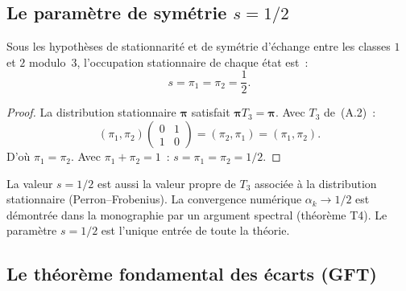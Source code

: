 \documentclass[12pt,a4paper]{article}
\begin{document}
\subsection{Le param\`etre de sym\'etrie $s = 1/2$}
\label{app:s_half}

\begin{derivedbox}[$s = 1/2$ comme distribution stationnaire]
Sous les hypoth\`eses de stationnarit\'e et de sym\'etrie d'\'echange
entre les classes $1$ et $2$ modulo~$3$, l'occupation stationnaire de
chaque \'etat est~:
\begin{equation}
  s = \pi_1 = \pi_2 = \frac{1}{2}.
  \tag{A.3}
\end{equation}

\begin{proof}
La distribution stationnaire $\bm{\pi}$ satisfait
$\bm{\pi} T_3 = \bm{\pi}$. Avec $T_3$ de~(A.2)~:
\[
  (\pi_1, \pi_2)
  \begin{pmatrix} 0 & 1 \\ 1 & 0 \end{pmatrix}
  = (\pi_2, \pi_1) = (\pi_1, \pi_2).
\]
D'o\`u $\pi_1 = \pi_2$. Avec $\pi_1 + \pi_2 = 1$~:
$s = \pi_1 = \pi_2 = 1/2$.
\end{proof}
\end{derivedbox}

\begin{remark}
La valeur $s = 1/2$ est aussi la valeur propre de $T_3$ associ\'ee
\`a la distribution stationnaire (Perron--Frobenius). La convergence
num\'erique $\alpha_k \to 1/2$ est d\'emontr\'ee dans la monographie
par un argument spectral (th\'eor\`eme T4). Le param\`etre $s = 1/2$
est l'unique entr\'ee de toute la th\'eorie.
\end{remark}

\subsection{Le th\'eor\`eme fondamental des \'ecarts (GFT)}
\label{app:gft}
\end{document}

